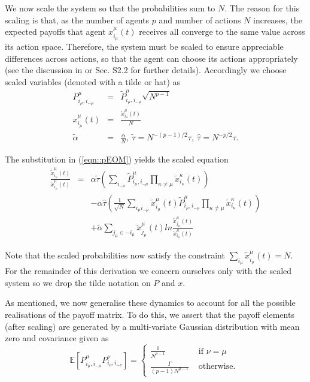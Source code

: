 \documentclass[sigconf,anonymous]{aamas}
\newcommand{\xmu}[2]{x_{#1_#2}^{#2}(t)}
\newcommand{\payoff}[2]{P^{#2}_{#1_#2, #1_{-#2}}}
\newcommand{\txmu}[2]{\tilde{x}_{#1_#2}^{#2}(t)}
\newcommand{\dtxmu}[2]{\dot{\tilde{x}}_{#1_#2}^{#2}(t)}
\newcommand{\tpayoff}[2]{\tilde{P}^{#2}_{#1_#2, #1_{-#2}}}
\newcommand{\talpha}{\tilde{\alpha}}
\newcommand{\ttau}{\tilde{\tau}}
\newcommand{\htau}{\hat{\tau}}
\begin{document}
We now scale the system so that the probabilities sum to $N$. The
reason for this scaling is that, as the number of agents $p$ and
number of actions $N$ increases, the expected payoffs that agent
$\xmu{i}{\mu}$ receives all converge to the same value across its action
space. Therefore, the system must be scaled to ensure appreciable
differences across actions, so that the agent can choose its actions
appropriately (see the discussion in \cite{Sanders2018} or
Sec. S2.2 for further details). Accordingly we choose
scaled variables (denoted with a tilde or hat) as
%
\begin{eqnarray*}
        \payoff{i}{\mu} & = & \tpayoff{i}{\mu} \sqrt{N^{p-1}}\\
        \xmu{i}{\mu} & = & \frac{\txmu{i}{\mu}}{N} \\
        \talpha & = & \frac{\alpha}{N}, \: 
        \ttau  =  N^{-(p-1)/2} \tau, \:
        \htau  =  N^{-p/2} \tau.
\end{eqnarray*}

The substitution in (\ref{eqn::pEOM}) yields the scaled equation
%
\begin{eqnarray}
    \frac{\dtxmu{i}{\mu}}{\txmu{i}{\mu}} & = & \alpha \ttau \left ( \sum_{i_{-\mu}} \tpayoff{i}{\mu} \prod_{\kappa \neq \mu} \txmu{i}{\kappa} \right ) \nonumber \\ & &  - \alpha \htau \left ( \frac{1}{\sqrt{N}} \sum_{i_\mu i_{-\mu}} \txmu{i}{\mu} \tpayoff{i}{\mu} \prod_{\kappa \neq \mu} \txmu{i}{\kappa} \right ) \nonumber  \\  & & + \talpha \sum_{j_\mu \in -i_\mu} \txmu{j}{\mu} ln \frac{\txmu{j}{\mu}}{\txmu{i}{\mu}}    \label{eqn::scaledEOM}
\end{eqnarray}

Note that the scaled probabilities now satisfy the constraint
$\sum_{i_\mu} \txmu{i}{\mu} = N$. For the remainder of this derivation
we concern ourselves only with the scaled system so we drop the tilde
notation on $P$ and $x$.

As mentioned, we now
generalise these dynamics to account for all the possible realisations
of the payoff matrix. To do this, we assert that the payoff elements
(after scaling) are generated by a multi-variate Gaussian distribution
with mean zero and covariance given as
%
\begin{equation}
\label{eqn::Payoffs}
        \mathbb{E}\left [ \payoff{i}{\mu} \payoff{i}{\nu} \right] = \begin{cases}
        \frac{1}{N^{p-1}} &  \text{ if } \nu = \mu \\
        \frac{\Gamma}{(p-1) N^{p-1}} & \text{ otherwise. }
        \end{cases}
\end{equation}
\end{document}
